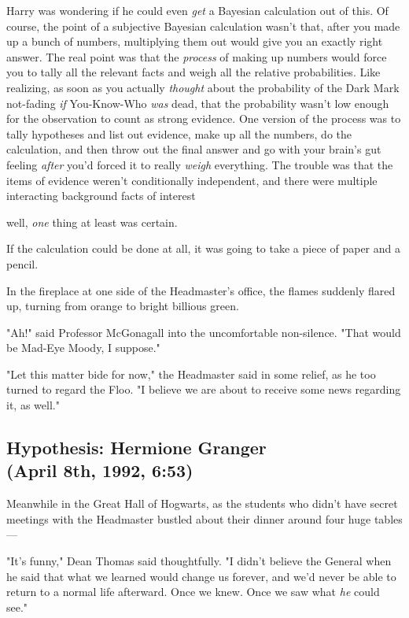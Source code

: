 Harry was wondering if he could even \emph{get} a Bayesian calculation out of
this. Of course, the point of a subjective Bayesian calculation wasn't that,
after you made up a bunch of numbers, multiplying them out would give you an
exactly right answer. The real point was that the \emph{process} of making up
numbers would force you to tally all the relevant facts and weigh all the
relative probabilities. Like realizing, as soon as you actually \emph{thought}
about the probability of the Dark Mark not-fading \emph{if} You-Know-Who
\emph{was} dead, that the probability wasn't low enough for the observation to
count as strong evidence. One version of the process was to tally hypotheses
and list out evidence, make up all the numbers, do the calculation, and then
throw out the final answer and go with your brain's gut feeling \emph{after}
you'd forced it to really \emph{weigh} everything. The trouble was that the
items of evidence weren't conditionally independent, and there were multiple
interacting background facts of interest{\el}

{\el} well, \emph{one} thing at least was certain.

If the calculation could be done at all, it was going to take a piece of paper
and a pencil.

In the fireplace at one side of the Headmaster's office, the flames suddenly
flared up, turning from orange to bright billious green.

"Ah!" said Professor McGonagall into the uncomfortable non-silence. "That would
be Mad-Eye Moody, I suppose."

"Let this matter bide for now," the Headmaster said in some relief, as he too
turned to regard the Floo. "I believe we are about to receive some news
regarding it, as well."
\sbreak
\vspace{-2\baselineskip}
\subsection{Hypothesis: Hermione Granger\\
(April 8th, 1992, 6:53\PM)}

Meanwhile in the Great Hall of Hogwarts, as the students who didn't have secret
meetings with the Headmaster bustled about their dinner around four huge
tables—

"It's funny," Dean Thomas said thoughtfully. "I didn't believe the General when
he said that what we learned would change us forever, and we'd never be able to
return to a normal life afterward. Once we knew. Once we saw what \emph{he}
could see."

